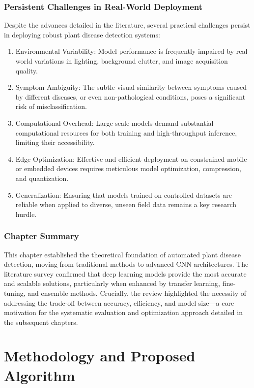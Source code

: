 \documentclass[12pt, a4paper]{report}
\begin{document}
\subsection{Persistent Challenges in Real-World Deployment}
Despite the advances detailed in the literature, several practical challenges persist in deploying robust plant disease detection systems:
\begin{enumerate}
    \item Environmental Variability: Model performance is frequently impaired by real-world variations in lighting, background clutter, and image acquisition quality.
    \item Symptom Ambiguity: The subtle visual similarity between symptoms caused by different diseases, or even non-pathological conditions, poses a significant risk of misclassification.
    \item Computational Overhead: Large-scale models demand substantial computational resources for both training and high-throughput inference, limiting their accessibility.
    \item Edge Optimization: Effective and efficient deployment on constrained mobile or embedded devices requires meticulous model optimization, compression, and quantization.
    \item Generalization: Ensuring that models trained on controlled datasets are reliable when applied to diverse, unseen field data remains a key research hurdle.
\end{enumerate}

\subsection{Chapter Summary}
\label{sec:summary}
This chapter established the theoretical foundation of automated plant disease detection, moving from traditional methods to advanced CNN architectures. The literature survey confirmed that deep learning models provide the most accurate and scalable solutions, particularly when enhanced by transfer learning, fine-tuning, and ensemble methods. Crucially, the review highlighted the necessity of addressing the trade-off between accuracy, efficiency, and model size—a core motivation for the systematic evaluation and optimization approach detailed in the subsequent chapters.
\newpage
\chapter{Methodology and Proposed Algorithm}
\label{chap:methodology}
\end{document}
